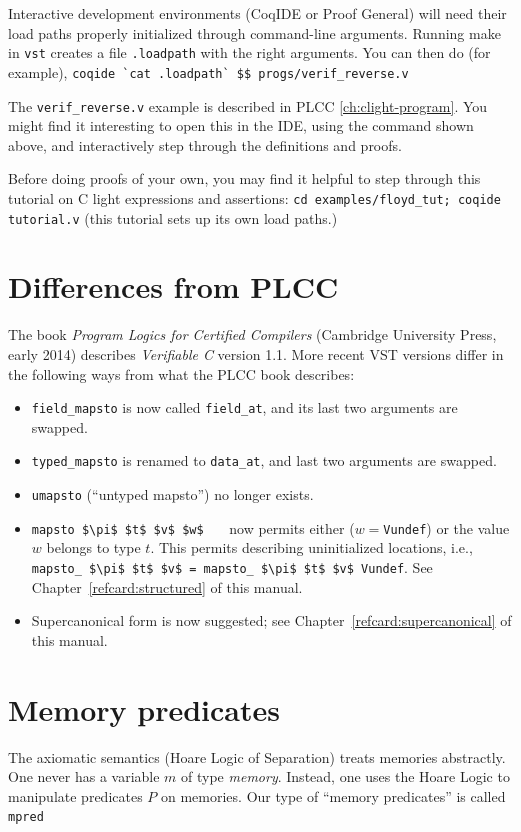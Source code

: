 \documentclass[12pt,fleqn,openany,oneside,showtrims]{memoir}
\newcommand{\ychapter}[2]{\chapter[#1]{#1 \hfill \normalsize #2}}
\begin{document}
Interactive development environments (CoqIDE or Proof General)
will need their load paths properly initialized through 
command-line arguments.  Running \textsf{make} in 
\lstinline{vst} creates a file \lstinline{.loadpath} with
the right arguments.  You can then do (for example),
\newline
\lstinline{coqide `cat .loadpath` $$ progs/verif_reverse.v}

The \lstinline{verif_reverse.v} example is described
in PLCC \autoref{ch:clight-program}.
You might find it interesting to open this in the IDE,
using the command shown above,
and interactively step through the definitions and proofs.

Before doing proofs of your own, you may find it helpful
to step through this tutorial on C light expressions and
assertions:\newline
\lstinline{cd examples/floyd_tut; coqide tutorial.v}\newline
(this tutorial sets up its own load paths.)

\ychapter{Differences from PLCC}{}
The book \emph{Program Logics for Certified Compilers}
(Cambridge University Press, early 2014) describes
\emph{Verifiable C} version 1.1.  
More recent VST versions differ in the following ways
from what the PLCC book describes:
\begin{itemize}
\item \lstinline{field_mapsto} is now called
\lstinline{field_at}, and its last two arguments are swapped.
\item \lstinline{typed_mapsto} is renamed to \lstinline{data_at}, and
   last two arguments are swapped.
\item \lstinline{umapsto} (``untyped mapsto'') no
longer exists.
\item \lstinline{mapsto $\pi$ $t$ $v$ $w$}
~~~now permits either ($w=$\lstinline{Vundef})
or the value $w$ belongs to type $t$.  
This permits describing uninitialized locations,
i.e., \lstinline{mapsto_ $\pi$ $t$ $v$ = mapsto_ $\pi$ $t$ $v$ Vundef}.
See Chapter~\ref{refcard:structured} of this manual.
\item Supercanonical form is now suggested; see 
Chapter~\ref{refcard:supercanonical} of this manual.
\end{itemize}
\ychapter{Memory predicates}{}

The axiomatic semantics (Hoare Logic of Separation) treats
memories abstractly.  One never has a variable $m$ of type
\emph{memory}.  Instead, one uses the Hoare Logic to manipulate
predicates $P$ on memories.  
Our type of ``memory predicates'' is called \lstinline{mpred}
\end{document}

